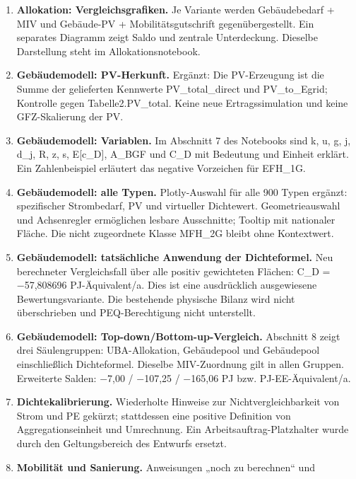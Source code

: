 \documentclass[
  ngerman,
  a4paper,
  DIV=11]{scrreprt}
\begin{document}
\begin{enumerate}
  Tabelle wurde in PV-Gesamtmenge/Gebäude/Freifläche,
  Verkehr-Gesamtmenge/ÖPNV/MIV/übriger Verkehr sowie Ergebnisse
  aufgeteilt. Absolute Mengen in PJ/a und die Bezugsgrößen der
  Prozentanteile sind explizit.
\item
  \textbf{Allokation: Vergleichsgrafiken.} Je Variante werden
  Gebäudebedarf + MIV und Gebäude-PV + Mobilitätsgutschrift
  gegenübergestellt. Ein separates Diagramm zeigt Saldo und zentrale
  Unterdeckung. Dieselbe Darstellung steht im Allokationsnotebook.
\item
  \textbf{Gebäudemodell: PV-Herkunft.} Ergänzt: Die PV-Erzeugung ist die
  Summe der gelieferten Kennwerte PV\_total\_direct und PV\_to\_Egrid;
  Kontrolle gegen Tabelle2.PV\_total. Keine neue Ertragssimulation und
  keine GFZ-Skalierung der PV.
\item
  \textbf{Gebäudemodell: Variablen.} Im Abschnitt 7 des Notebooks sind
  k, u, g, j, d\_j, R, z, s, E{[}c\_D{]}, A\_BGF und C\_D mit Bedeutung
  und Einheit erklärt. Ein Zahlenbeispiel erläutert das negative
  Vorzeichen für EFH\_1G.
\item
  \textbf{Gebäudemodell: alle Typen.} Plotly-Auswahl für alle 900 Typen
  ergänzt: spezifischer Strombedarf, PV und virtueller Dichtewert.
  Geometrieauswahl und Achsenregler ermöglichen lesbare Ausschnitte;
  Tooltip mit nationaler Fläche. Die nicht zugeordnete Klasse MFH\_2G
  bleibt ohne Kontextwert.
\item
  \textbf{Gebäudemodell: tatsächliche Anwendung der Dichteformel.} Neu
  berechneter Vergleichsfall über alle positiv gewichteten Flächen: C\_D
  = −57,808696 PJ-Äquivalent/a. Dies ist eine ausdrücklich ausgewiesene
  Bewertungsvariante. Die bestehende physische Bilanz wird nicht
  überschrieben und PEQ-Berechtigung nicht unterstellt.
\item
  \textbf{Gebäudemodell: Top-down/Bottom-up-Vergleich.} Abschnitt 8
  zeigt drei Säulengruppen: UBA-Allokation, Gebäudepool und Gebäudepool
  einschließlich Dichteformel. Dieselbe MIV-Zuordnung gilt in allen
  Gruppen. Erweiterte Salden: −7,00 / −107,25 / −165,06 PJ bzw.
  PJ-EE-Äquivalent/a.
\item
  \textbf{Dichtekalibrierung.} Wiederholte Hinweise zur
  Nichtvergleichbarkeit von Strom und PE gekürzt; stattdessen eine
  positive Definition von Aggregationseinheit und Umrechnung. Ein
  Arbeitsauftrag-Platzhalter wurde durch den Geltungsbereich des
  Entwurfs ersetzt.
\item
  \textbf{Mobilität und Sanierung.} Anweisungen „noch zu berechnen`` und

\end{enumerate}
\end{document}
